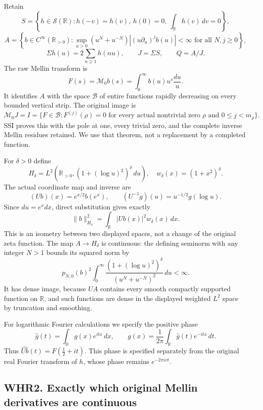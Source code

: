 Retain \[
 S=\left\{h\in\mathcal S(\mathbb R):h(-v)=h(v),\ h(0)=0,
              \ \int_{\mathbb R}h(v)\,dv=0\right\},
\] \[
 A=\left\{b\in C^\infty(\mathbb R_{>0}):
 \sup_{u>0}(u^N+u^{-N})|(u\partial_u)^jb(u)|<\infty
 \text{ for all }N,j\geq0\right\},
\] \[
 \Sigma h(u)=2\sum_{n\geq1}h(nu),\qquad J=\Sigma S,
 \qquad Q=A/J.
 \tag{WHR1.1}
\] The raw Mellin transform is \[
 F(s)=\mathcal M_0b(s)=\int_0^\infty b(u)u^s\frac{du}{u}.
 \tag{WHR1.2}
\] It identifies \(A\) with the space \(\mathcal B\) of entire functions
rapidly decreasing on every bounded vertical strip. The original image
is \[
 \mathcal M_0J=I=\{F\in\mathcal B:
 F^{(j)}(\rho)=0\text{ for every actual nontrivial zero }\rho
 \text{ and }0\leq j<m_\rho\}.
 \tag{WHR1.3}
\] SSI proves this with the pole at one, every trivial zero, and the
complete inverse Mellin residues retained. We use that theorem, not a
replacement by a completed function.

For \(\delta>0\) define \[
 H_\delta=L^2\!\left(\mathbb R_{>0},
       (1+(\log u)^2)^\delta\,du\right),
 \quad w_\delta(x)=(1+x^2)^\delta.
 \tag{WHR1.4}
\] The actual coordinate map and inverse are \[
 (Ub)(x)=e^{x/2}b(e^x),\qquad
 (U^{-1}g)(u)=u^{-1/2}g(\log u).
 \tag{WHR1.5}
\] Since \(du=e^x dx\), direct substitution gives exactly \[
 \|b\|_{H_\delta}^2
 =\int_{\mathbb R}|Ub(x)|^2w_\delta(x)\,dx.
 \tag{WHR1.6}
\] This is an isometry between two displayed spaces, not a change of the
original zeta function. The map \(A\to H_\delta\) is continuous: the
defining seminorm with any integer \(N>1\) bounds its squared norm by \[
 p_{N,0}(b)^2\int_0^\infty
 \frac{(1+(\log u)^2)^\delta}{(u^N+u^{-N})^2}\,du<\infty.
\] It has dense image, because \(U A\) contains every smooth compactly
supported function on \(\mathbb R\), and such functions are dense in the
displayed weighted \(L^2\) space by truncation and smoothing.

For logarithmic Fourier calculations we specify the positive phase \[
 \widehat g(t)=\int_{\mathbb R}g(x)e^{itx}\,dx,
 \qquad g(x)=\frac1{2\pi}\int_{\mathbb R}\widehat g(t)e^{-itx}\,dt.
 \tag{WHR1.7}
\] Thus \(\widehat{Ub}(t)=F(\tfrac12+it)\). This phase is specified
separately from the original real Fourier transform of \(h\), whose
phase remains \(e^{-2\pi ivt}\).

\subsection{WHR2. Exactly which original Mellin derivatives are
continuous}\label{whr2.-exactly-which-original-mellin-derivatives-are-continuous}

